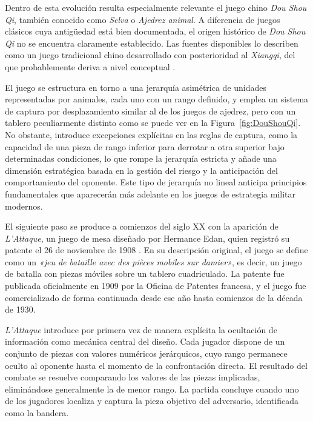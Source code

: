 Dentro de esta evolución resulta especialmente relevante el juego chino \textit{Dou Shou Qi}, también conocido como \textit{Selva} o \textit{Ajedrez animal}. A diferencia de juegos clásicos cuya antigüedad está bien documentada, el origen histórico de \textit{Dou Shou Qi} no se encuentra claramente establecido. Las fuentes disponibles lo describen como un juego tradicional chino desarrollado con posterioridad al \textit{Xiangqi}, del que probablemente deriva a nivel conceptual \cite{ChessVariantsDouShouQi}.

El juego se estructura en torno a una jerarquía asimétrica de unidades representadas por animales, cada uno con un rango definido, y emplea un sistema de captura por desplazamiento similar al de los juegos de ajedrez, pero con un tablero peculiarmente distinto como se puede ver en la Figura~\ref{fig:DouShouQi}. No obstante, introduce excepciones explícitas en las reglas de captura, como la capacidad de una pieza de rango inferior para derrotar a otra superior bajo determinadas condiciones, lo que rompe la jerarquía estricta y añade una dimensión estratégica basada en la gestión del riesgo y la anticipación del comportamiento del oponente. Este tipo de jerarquía no lineal anticipa principios fundamentales que aparecerán más adelante en los juegos de estrategia militar modernos.

El siguiente paso se produce a comienzos del siglo XX con la aparición de \textit{L’Attaque}, un juego de mesa diseñado por Hermance Edan, quien registró su patente el 26 de noviembre de 1908 \cite{BAdaLAttaque}. En su descripción original, el juego se define como un \textit{«jeu de bataille avec des pièces mobiles sur damier»}, es decir, un juego de batalla con piezas móviles sobre un tablero cuadriculado. La patente fue publicada oficialmente en 1909 por la Oficina de Patentes francesa, y el juego fue comercializado de forma continuada desde ese año hasta comienzos de la década de 1930.

\textit{L’Attaque} introduce por primera vez de manera explícita la ocultación de información como mecánica central del diseño. Cada jugador dispone de un conjunto de piezas con valores numéricos jerárquicos, cuyo rango permanece oculto al oponente hasta el momento de la confrontación directa. El resultado del combate se resuelve comparando los valores de las piezas implicadas, eliminándose generalmente la de menor rango. La partida concluye cuando uno de los jugadores localiza y captura la pieza objetivo del adversario, identificada como la bandera.

